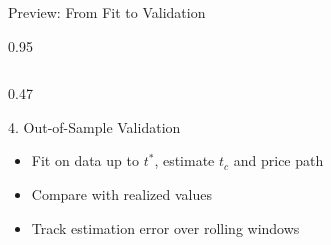 \documentclass[9pt, aspectratio=169, t]{beamer}
\begin{document}
\begin{frame}{Preview: From Fit to Validation}
\begin{cminipage}{0.95\textwidth}
{\begin{columns}[T]
\begin{column}{0.47\textwidth}
            \begin{block}{4. Out-of-Sample Validation}
                \begin{itemize}\setlength{\itemsep}{0pt}
                    \item Fit on data up to $t^*$, estimate $t_c$ and price path
                    \item Compare with realized values
                    \item Track estimation error over rolling windows
                \end{itemize}
            \end{block}
        \end{column}
    \end{columns}
    }
    \end{cminipage}
\end{frame}
\end{document}
